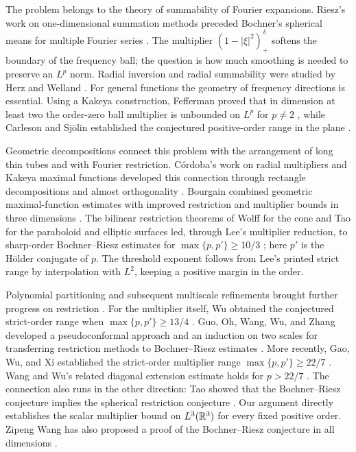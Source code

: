 The problem belongs to the theory of summability of Fourier expansions.
Riesz's work on one-dimensional summation methods
\citep{Riesz1923} preceded Bochner's spherical means for multiple
Fourier series \citep{Bochner1935,Bochner1936}. The multiplier
$(1-|\xi|^2)_+^\delta$ softens the boundary of the frequency ball;
the question is how much smoothing is needed to preserve an $L^p$
norm. Radial inversion and radial summability were studied by Herz
and Welland \citep{Herz1954,Welland1975}. For general functions the
geometry of frequency directions is essential. Using a Kakeya
construction, Fefferman proved that in dimension at least two the
order-zero ball multiplier is unbounded on $L^p$ for $p\ne2$
\citep{Fefferman1971}, while Carleson and Sj\"olin established the
conjectured positive-order range in the plane \citep{CarlesonSjolin1972}.

Geometric decompositions connect this problem with the arrangement of
long thin tubes and with Fourier restriction. C\'ordoba's work on
radial multipliers and Kakeya maximal functions developed this
connection through rectangle decompositions and almost orthogonality
\citep{Cordoba1975,Cordoba1977}. Bourgain combined geometric
maximal-function estimates with improved restriction and multiplier
bounds in three dimensions \citep{Bourgain1991RestrictionMultiplier}.
The bilinear restriction theorems of Wolff for the cone and Tao for
the paraboloid and elliptic surfaces
\citep{Wolff2001,Tao2003} led, through Lee's multiplier reduction,
to sharp-order Bochner--Riesz estimates for
$\max\{p,p'\}\ge10/3$ \citep{Lee2004}; here $p'$ is the
H\"older conjugate of $p$. The threshold exponent follows from
Lee's printed strict range by interpolation with $L^2$, keeping a
positive margin in the order.

Polynomial partitioning and subsequent multiscale refinements brought
further progress on restriction \citep{Guth2016,WangBrooms2020}.
For the multiplier itself, Wu obtained the conjectured strict-order
range when $\max\{p,p'\}\ge13/4$ \citep{Wu2023}.
Guo, Oh, Wang, Wu, and Zhang developed a pseudoconformal approach
and an induction on two scales for transferring restriction methods
to Bochner--Riesz estimates \citep{GuoOhWangWuZhang2025}.
More recently, Gao, Wu, and Xi established the strict-order multiplier
range $\max\{p,p'\}\ge22/7$
\citep[Corollary~1.3]{GaoWuXi2026}. Wang and Wu's related diagonal
extension estimate holds for $p>22/7$
\citep[Theorem~0.2]{WangWu2024}. The connection also runs in the other
direction: Tao showed that the Bochner--Riesz conjecture implies the
spherical restriction conjecture \citep{Tao1999}. Our argument directly
establishes the scalar multiplier bound on $L^3(\mathbb R^3)$ for every fixed
positive order.
Zipeng Wang has also proposed a proof of the Bochner--Riesz conjecture
in all dimensions \citep[version~6, Theorem~One]{ZipengWang2026}.


